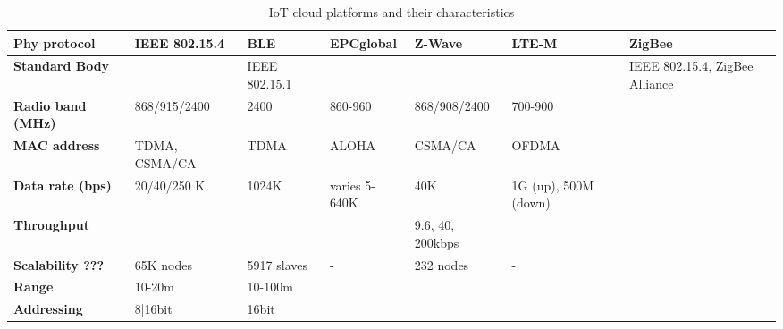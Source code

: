 \begin{table}[h!]
\scriptsize
	\begin{tabulary}{\textwidth}{L|L|L|L|L|L|L}
	\bf{Phy protocol}     & \bf{IEEE 802.15.4} & \bf{BLE}      & \bf{EPCglobal} & \bf{Z-Wave}              & \bf{LTE-M}           & \bf{ZigBee} \\\hline
	\bf{Standard Body}    &                    & IEEE 802.15.1 &                &                          &                      & IEEE 802.15.4, ZigBee Alliance \\\hline
	\bf{Radio band (MHz)} & 868/915/2400       & 2400          & 860-960        & 868/908/2400             & 700-900              & \\\hline
	\bf{MAC address}      & TDMA, CSMA/CA      & TDMA          & ALOHA          & CSMA/CA                  & OFDMA                & \\\hline
	\bf{Data rate (bps)}  & 20/40/250 K        & 1024K         & varies 5-640K  & 40K                      & 1G (up), 500M (down) & \\\hline
	\bf{Throughput}       &                    &               &                & 9.6, 40, 200kbps         &                      & \\\hline
	\bf{Scalability ???}  & 65K nodes          & 5917 slaves   & -              & 232 nodes                & -                    & \\\hline
	\bf{Range}            & 10-20m             & 10-100m       &                &                          &                      & \\\hline
	\bf{Addressing}       & 8|16bit            & 16bit         &                &                          &                      & \\\hline
	\end{tabulary}
	\caption{\label{tab:IoT_cloud} IoT cloud platforms and their characteristics \cite{al-fuqaha_internet_24}}
\end{table}

